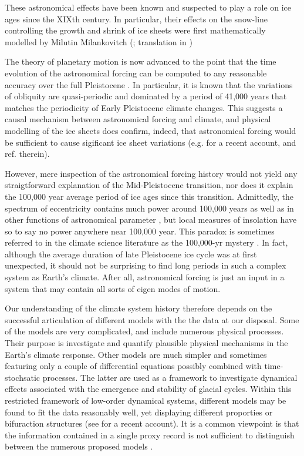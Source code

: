 \documentclass[a4paper,12pt]{article}
\begin{document}
These astronomical effects have been known and suspected to play a role on ice ages since the XIXth century. In  particular, their effects on the snow-line controlling the growth and shrink of ice sheets were first mathematically modelled by Milutin Milankovitch (\cite{milankovitch41_original}; translation in \cite{milankovitch41})

The theory of planetary motion is now advanced to the point that the time evolution of the astronomical forcing can be computed to any reasonable accuracy over the full Pleistocene \cite{Berger1978a, Laskar04aa}. In particular, it is known that the variations of obliquity are quasi-periodic and dominated by a period of 41,000 years that matches the periodicity of Early Pleistocene climate changes. This suggests a causal mechanism between astronomical forcing and climate, and physical modelling of the ice sheets does confirm, indeed, that astronomical forcing would be sufficient to cause sigificant ice sheet variations (e.g. \cite{Abe-Ouchi13aa} for a recent account, and ref. therein). 

However, mere inspection of the astronomical forcing history would not yield any straigtforward explanation of the Mid-Pleistocene transition, nor does it explain the 100,000 year average period of ice ages since this transition. Admittedly, the spectrum of eccentricity contains much power around 100,000 years \cite{Berger1978a} as well as in other functions of astronomical parameter \cite{Berger05aa}, but local measures of insolation \cite{Hays1976} have so to say no power anywhere near 100,000 year. This paradox is sometimes referred to in the climate science literature as the 100,000-yr mystery \cite{Ruddiman06aa}. 
In fact, although the average duration of late Pleistocene ice cycle was at first unexpected, it should
 not be surprising to find long periods in such a  complex system as Earth's climate. After all, astronomical forcing
is just an input in a system that may contain all sorts of eigen modes of motion. 

Our understanding of the climate system history therefore depends on the successful  
articulation of different models with the 
the data at our disposal. Some of the models are very complicated, and include numerous
physical processes. Their purpose is investigate and quantify plausible physical mechanisms
in the Earth's climate response. Other models are much simpler and sometimes featuring 
only a couple of differential equations possibly combined with time-stochsatic processes.
The latter are used as a framework to investigate dynamical effects associated
with the emergence and stability of glacial cycles. 
Within this restricted framework of low-order dynamical systems, 
different models may be found to fit the data reasonably well, 
yet displaying different proporties  or bifuraction structures
(see \cite{Crucifix2013, DitlevsenXX} for a recent account).
It is a common viewpoint is that the  information contained in a single proxy record is not
sufficient  to distinguish between the numerous proposed models
\cite{Cane2006,Roe1999}.
\end{document}
